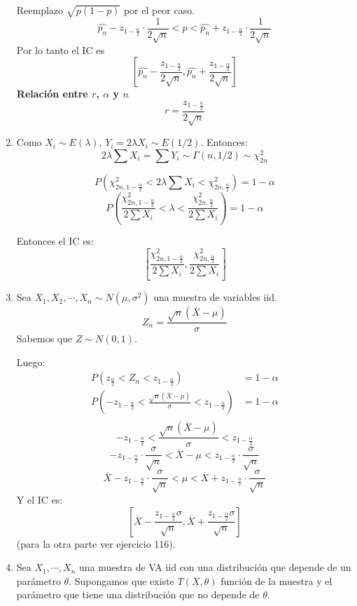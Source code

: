 \begin{enumerate}
		Reemplazo $\sqrt{p(1-p)}$ por el peor caso.
		$$\hat{p_n} - z_{1-\frac{\alpha}{2}}\cdot \frac{1}{2\sqrt{n}} < p < \hat{p_n} + z_{1-\frac{\alpha}{2}}\cdot \frac{1}{2\sqrt{n}}$$
		Por lo tanto el IC es
		$$\left[\hat{p_n} - \frac{z_{1-\frac{\alpha}{2}}}{2\sqrt{n}}, \hat{p_n} + \frac{z_{1-\frac{\alpha}{2}}}{2\sqrt{n}}\right]$$
		\textbf{Relación entre $r$, $\alpha$ y $n$}
		$$r = \frac{z_{1-\frac{\alpha}{2}}}{2\sqrt{n}}$$
	\item
		Como $X_i\sim E(\lambda)$, $Y_i = 2\lambda X_i \sim E(1/2)$.
		Entonces:
		$$2\lambda\sum X_i = \sum Y_i \sim \Gamma(n, 1/2) \sim \chi^2_{2n}$$

		$$P(\chi^2_{2n, 1-\frac{\alpha}{2}} < 2\lambda\sum X_i < \chi^2_{2n, \frac{\alpha}{2}}) = 1 - \alpha$$
		$$P\left(\frac{\chi^2_{2n, 1-\frac{\alpha}{2}}}{2\sum X_i} < \lambda < \frac{\chi^2_{2n, \frac{\alpha}{2}}}{2\sum X_i}\right) = 1 - \alpha$$

		Entonces el IC es:
		$$\left[\frac{\chi^2_{2n, 1-\frac{\alpha}{2}}}{2\sum X_i}, \frac{\chi^2_{2n, \frac{\alpha}{2}}}{2\sum X_i}\right]$$
	\item
		Sea $X_1, X_2, \cdots, X_n \sim N(\mu, \sigma^2)$ una muestra de variables iid.
		$$Z_n = \frac{\sqrt{n}(\overline X - \mu)}{\sigma}$$
		Sabemos que $Z\sim N(0,1)$.

		Luego:
		\begin{align*}
			P(z_{\frac{\alpha}{2}} < Z_n < z_{1-\frac{\alpha}{2}})	& = 1 - \alpha	\\
			P\left(-z_{1-\frac{\alpha}{2}} < \frac{\sqrt{n}(\overline X - \mu)}{\sigma} < z_{1-\frac{\alpha}{2}}\right)	& = 1 - \alpha	\\
		\end{align*}
		$$-z_{1-\frac{\alpha}{2}} < \frac{\sqrt{n}(\overline X - \mu)}{\sigma} < z_{1-\frac{\alpha}{2}}$$
		$$-z_{1-\frac{\alpha}{2}}\cdot\frac{\sigma}{\sqrt{n}} < \overline X - \mu < z_{1-\frac{\alpha}{2}}\cdot\frac{\sigma}{\sqrt{n}}$$
		$$\overline X - z_{1-\frac{\alpha}{2}}\cdot\frac{\sigma}{\sqrt{n}} < \mu < \overline X + z_{1-\frac{\alpha}{2}}\cdot\frac{\sigma}{\sqrt{n}}$$
		Y el IC es:
		$$\left[\overline X - \frac{z_{1-\frac{\alpha}{2}}\sigma}{\sqrt{n}} ,  \overline X + \frac{z_{1-\frac{\alpha}{2}}\sigma}{\sqrt{n}}\right]$$
		(para la otra parte ver ejercicio 116).
	\item
		Sea $X_1, \cdots, X_n$ una muestra de VA iid con una distribución que depende de un parámetro $\theta$.
		Supongamos que existe $T(\underline X, \theta)$ función de la muestra y el parámetro que tiene una distribución que no depende de $\theta$.


\end{enumerate}
